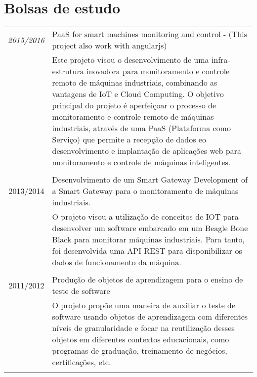 \documentclass[a4paper,10pt]{article}
\begin{document}
\section{Bolsas de estudo}
\begin{tabular}{r|p{11cm}}

\emph{2015/2016} & PaaS for smart machines monitoring and control - (This project also work with angularjs)\\
&\footnotesize{Este projeto visou o desenvolvimento de uma infra-estrutura inovadora para monitoramento e controle remoto de máquinas industriais, combinando as vantagens de IoT e Cloud Computing. O objetivo principal do projeto é aperfeiçoar o processo de monitoramento e controle remoto de máquinas industriais, através de uma PaaS (Plataforma como Serviço) que permite a recepção de dados eo desenvolvimento e implantação de aplicações web para monitoramento e controle de máquinas inteligentes.} \\\multicolumn{2}{c}{} \\

\textsc{2013/2014} & Desenvolvimento de um Smart Gateway Development of a Smart Gateway para o monitoramento de máquinas industriais.\\
&\footnotesize{O projeto visou a utilização de conceitos de IOT para desenvolver um software embarcado em um Beagle Bone Black para monitorar máquinas industriais. Para tanto, foi desenvolvida uma API REST para disponibilizar os dados de funcionamento da máquina.}\\\multicolumn{2}{c}{} \\

\textsc{2011/2012} & Produção de objetos de aprendizagem para o ensino de teste de software\\
&\footnotesize{O projeto propõe uma maneira de auxiliar o teste de software usando objetos de aprendizagem com diferentes níveis de granularidade e focar na reutilização desses objetos em diferentes contextos educacionais, como programas de graduação, treinamento de negócios, certificações, etc.}\\\multicolumn{2}{c}{} \\

\end{tabular}

\end{document}
